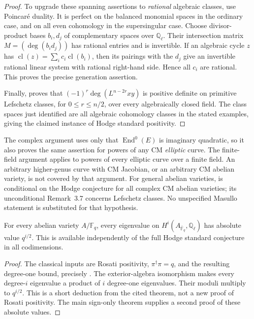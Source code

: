 \begin{proof}
To upgrade these spanning assertions to \emph{rational} algebraic classes, use Poincar\'e duality. It is perfect on the balanced monomial spaces in the ordinary case, and on all even cohomology in the supersingular case. Choose divisor-product bases $b_i,d_j$ of complementary spaces over $\mathbb Q_\ell$. Their intersection matrix $M=(\deg(b_i d_j))$ has rational entries and is invertible. If an algebraic cycle $z$ has
$\operatorname{cl}(z)=\sum_i c_i\operatorname{cl}(b_i)$, then its pairings with the $d_j$ give an invertible rational linear system with rational right-hand side. Hence all $c_i$ are rational. This proves the precise generation assertion.

Finally, \cite[Remark~3.7]{MilnePolarizations} proves that
$(-1)^r\deg(L^{n-2r}xy)$ is positive definite on primitive Lefschetz classes, for $0\le r\le n/2$, over every algebraically closed field. The class spaces just identified are all algebraic cohomology classes in the stated examples, giving the claimed instance of Hodge standard positivity.
\end{proof}

\begin{remark}
The complex argument uses only that $\operatorname{End}^0(E)$ is imaginary quadratic, so it also proves the same assertion for powers of any CM \emph{elliptic} curve. The finite-field argument applies to powers of every elliptic curve over a finite field. An arbitrary higher-genus curve with CM Jacobian, or an arbitrary CM abelian variety, is not covered by that argument. For general abelian varieties, \cite[Th.~3.3]{MilnePolarizations} is conditional on the Hodge conjecture for all complex CM abelian varieties; its unconditional Remark~3.7 concerns Lefschetz classes. No unspecified Masullo statement is substituted for that hypothesis.
\end{remark}

\begin{corollary}
For every abelian variety $A/\mathbb F_q$, every eigenvalue on $H^i(A_{\overline{\mathbb F}_q},\mathbb Q_\ell)$ has absolute value $q^{i/2}$. This is available independently of the full Hodge standard conjecture in all codimensions.
\end{corollary}

\begin{proof}
The classical inputs are Rosati positivity, $\pi^\dagger\pi=q$, and the resulting degree-one bound, precisely \cite[Th.~13.2, Lemmas~14.2--14.3 and Th.~14.1]{MilneAV}. The exterior-algebra isomorphism \cite[Th.~11.1(b)]{MilneAV} makes every degree-$i$ eigenvalue a product of $i$ degree-one eigenvalues. Their moduli multiply to $q^{i/2}$. This is a short deduction from the cited theorem, not a new proof of Rosati positivity. The main sign-only theorem supplies a second proof of these absolute values.
\end{proof}

